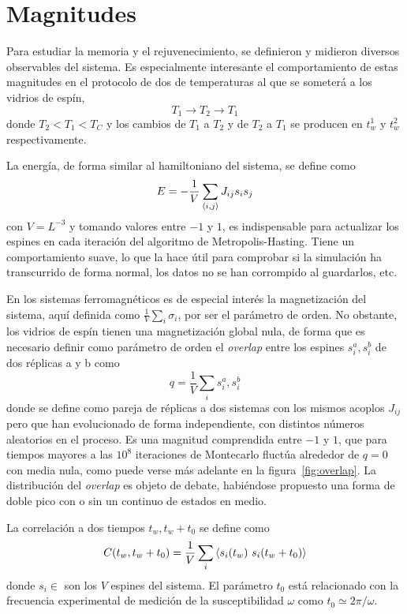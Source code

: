 \documentclass[11pt]{report}
\newcommand{\sub}[1]{ _{{\scriptscriptstyle \mathit{#1}}}  }
\begin{document}
\section{Magnitudes}

Para estudiar la memoria y el rejuvenecimiento, se definieron y
midieron diversos observables del sistema. Es especialmente
interesante el comportamiento de estas magnitudes en el protocolo
de dos de temperaturas al que se someterá a los vidrios de espín,
\begin{equation*}
  T_1 → T_2 → T_1
\end{equation*}
donde $T_2<T_1<T\sub{C}$ y los cambios de $T_1$ a $T_2$ y de $T_2$ a
$T_1$ se producen en $t_w^1$ y $t_w^2$ respectivamente.

La energía, de forma similar al hamiltoniano del sistema, se define como
\begin{equation}
  E = - \frac{1}{V} \sum_{\expval{i,j}}  J_{ij} s_i s_j
\end{equation}
con $V=L^{-3}$ y tomando valores entre $-1$ y $1$, es indispensable para actualizar los
espines en cada iteración del algoritmo de Metropolis-Hasting. Tiene
un comportamiento suave, lo que la hace útil para comprobar si la
simulación ha transcurrido de forma normal, los datos no se han
corrompido al guardarlos, etc.

En los sistemas ferromagnéticos es de especial interés la
magnetización del sistema, aquí definida como
$\frac{1}{V}\sum_{i}σ_i$, por ser el parámetro de orden. No obstante,
los vidrios de espín tienen una magnetización global nula, de forma
que es necesario definir como parámetro de orden el \textit{overlap} entre
los espines $s^a_i, s_i^b$ de dos réplicas a y b como
\begin{equation}
  q = \frac{1}{V} \sum_{i} s^a_i, s_i^b
\end{equation}
donde se define como pareja de réplicas a dos sistemas con los mismos
acoplos $J_{ij}$ pero que han evolucionado de forma independiente, con
distintos números aleatorios en el proceso. Es una magnitud
comprendida entre $-1$ y $1$, que para tiempos mayores a las $10^8$
iteraciones de Montecarlo fluctúa alrededor de $q=0$ con media nula,
como puede verse más adelante en la figura~\ref{fig:overlap}. La distribución del
\textit{overlap} es objeto de debate, habiéndose propuesto una forma de doble
pico con o sin un continuo de estados en medio.

La correlación a dos tiempos $t_w, t_w+t_0$ se define como
\begin{equation}
  C(t_w,t_w+t_0) = \frac{1}{V} \sum_{i}\expval{s_i(t_w)\ s_i
    (t_w+t_0)}
\end{equation}
donde $s_i∈$ son los $V$ espines del sistema. El parámetro $t_0$ está
relacionado con la frecuencia experimental de medición de la
susceptibilidad $ω$ como $t_0 ≃ 2π/ω$.
\end{document}
